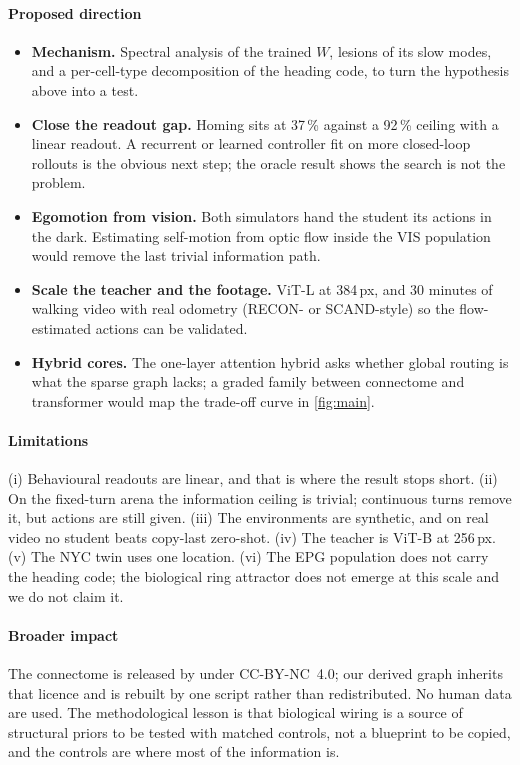 \paragraph{Proposed direction}
\begin{itemize}
  \item \textbf{Mechanism.} Spectral analysis of the trained $W$, lesions of its slow modes, and a per-cell-type
        decomposition of the heading code, to turn the hypothesis above into a test.
  \item \textbf{Close the readout gap.} Homing sits at 37\,\% against a 92\,\% ceiling with a linear readout. A
        recurrent or learned controller fit on more closed-loop rollouts is the obvious next step; the oracle result
        shows the search is not the problem.
  \item \textbf{Egomotion from vision.} Both simulators hand the student its actions in the dark. Estimating
        self-motion from optic flow inside the VIS population would remove the last trivial information path.
  \item \textbf{Scale the teacher and the footage.} ViT-L at 384\,px, and 30 minutes of walking video with real
        odometry (RECON- or SCAND-style) so the flow-estimated actions can be validated.
  \item \textbf{Hybrid cores.} The one-layer attention hybrid asks whether global routing is what the sparse graph
        lacks; a graded family between connectome and transformer would map the trade-off curve in \cref{fig:main}.
\end{itemize}

\paragraph{Limitations}
(i) Behavioural readouts are linear, and that is where the result stops short. (ii) On the fixed-turn arena the
information ceiling is trivial; continuous turns remove it, but actions are still given. (iii) The environments are
synthetic, and on real video no student beats copy-last zero-shot. (iv) The teacher is ViT-B at 256\,px. (v) The NYC
twin uses one location. (vi) The EPG population does not carry the heading code; the biological ring attractor does
not emerge at this scale and we do not claim it.

\paragraph{Broader impact}
The connectome is released by \flywire under CC-BY-NC~4.0; our derived graph inherits that licence and is rebuilt by
one script rather than redistributed. No human data are used. The methodological lesson is that biological wiring is a
source of structural priors to be tested with matched controls, not a blueprint to be copied, and the controls are
where most of the information is.

